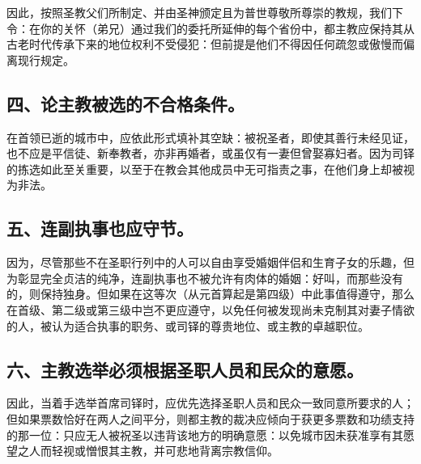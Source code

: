 因此，按照圣教父们所制定、并由圣神颁定且为普世尊敬所尊崇的教规，我们下令：在你的关怀（弟兄）通过我们的委托所延伸的每个省份中，都主教应保持其从古老时代传承下来的地位权利不受侵犯：但前提是他们不得因任何疏忽或傲慢而偏离现行规定。\par


\subsection{四、论主教被选的不合格条件。}

在首领已逝的城市中，应依此形式填补其空缺：被祝圣者，即使其善行未经见证，也不应是平信徒、新奉教者，亦非再婚者，或虽仅有一妻但曾娶寡妇者。因为司铎的拣选如此至关重要，以至于在教会其他成员中无可指责之事，在他们身上却被视为非法。\par


\subsection{五、连副执事也应守节。}

因为，尽管那些不在圣职行列中的人可以自由享受婚姻伴侣和生育子女的乐趣，但为彰显完全贞洁的纯净，连副执事也不被允许有肉体的婚姻：好叫，而那些没有的，则保持独身。但如果在这等次（从元首算起是第四级）中此事值得遵守，那么在首级、第二级或第三级中岂不更应遵守，以免任何被发现尚未克制其对妻子情欲的人，被认为适合执事的职务、或司铎的尊贵地位、或主教的卓越职位。\par


\subsection{六、主教选举必须根据圣职人员和民众的意愿。}

因此，当着手选举首席司铎时，应优先选择圣职人员和民众一致同意所要求的人；但如果票数恰好在两人之间平分，则都主教的裁决应倾向于获更多票数和功绩支持的那一位：只应无人被祝圣以违背该地方的明确意愿：以免城市因未获准享有其愿望之人而轻视或憎恨其主教，并可悲地背离宗教信仰。\par


